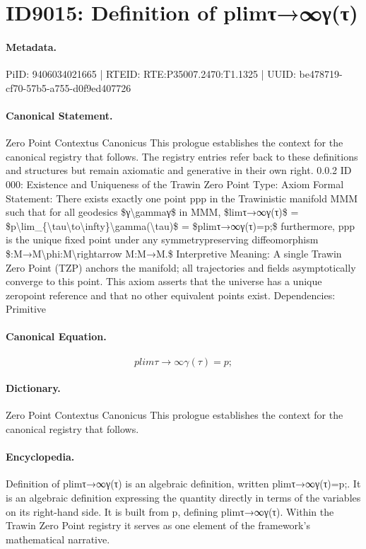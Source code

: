 \section*{ID9015: Definition of plimτ→∞γ(τ)}
\paragraph{Metadata.}
PiID: 9406034021665 | RTEID: RTE:P35007.2470:T1.1325 | UUID: be478719-cf70-57b5-a755-d0f9ed407726

\paragraph{Canonical Statement.}
Zero Point Contextus Canonicus This prologue establishes the context for the canonical registry that follows. The registry entries refer back to these definitions and structures but remain axiomatic and generative in their own right. 0.0.2 ID 000: Existence and Uniqueness of the Trawin Zero Point Type: Axiom Formal Statement: There exists exactly one point ppp in the Trawinistic manifold MMM such that for all geodesics \$γ\textbackslash{}gammaγ\$ in MMM, \$limτ→∞γ(τ)\$ = \$p\textbackslash{}lim\_\{\textbackslash{}tau\textbackslash{}to\textbackslash{}infty\}\textbackslash{}gamma(\textbackslash{}tau)\$ = \$plimτ→∞γ(τ)=p;\$ furthermore, ppp is the unique fixed point under any symmetrypreserving diffeomorphism \$:M→M\textbackslash{}phi:M\textbackslash{}rightarrow M:M→M.\$ Interpretive Meaning: A single Trawin Zero Point (TZP) anchors the manifold; all trajectories and fields asymptotically converge to this point. This axiom asserts that the universe has a unique zeropoint reference and that no other equivalent points exist. Dependencies: Primitive

\paragraph{Canonical Equation.}
\[
plimτ→∞γ(τ)=p;
\]

\paragraph{Dictionary.}
Zero Point Contextus Canonicus This prologue establishes the context for the canonical registry that follows.

\paragraph{Encyclopedia.}
Definition of plimτ→∞γ(τ) is an algebraic definition, written plimτ→∞γ(τ)=p;. It is an algebraic definition expressing the quantity directly in terms of the variables on its right-hand side. It is built from p, defining plimτ→∞γ(τ). Within the Trawin Zero Point registry it serves as one element of the framework's mathematical narrative.
